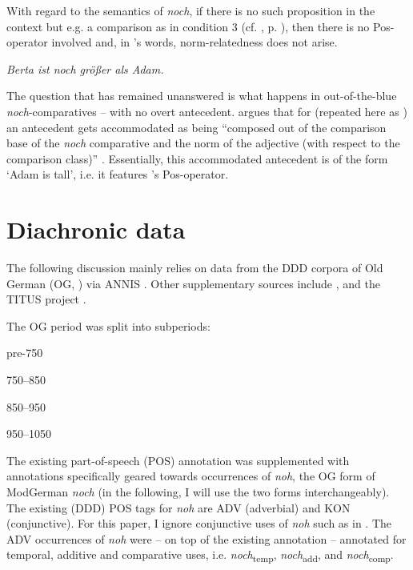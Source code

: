 \documentclass[output=paper]{langsci/langscibook}
\begin{document}
With regard to the semantics of \textit{noch}, if there is no such proposition in the context but e.g. a comparison as in condition 3 (cf. , p. \pageref{tab:4_conds}), then there is no Pos-operator involved \citep[62]{vonStechow1984} and, in \citeauthor{umbach2009a_comp}'s words, norm-relatedness does not arise.

\ea \itshape Berta ist noch größer als Adam. \label{B_noch_>_Adam_repeat}\z

The question that has remained unanswered is what happens in out-of-the-blue \textit{noch}-comparatives -- with no overt antecedent. \citeauthor{umbach2009a_comp} argues that for  (repeated here as ) an antecedent gets accommodated as being ``composed out of the comparison base of the \textit{noch} comparative and the norm of the adjective (with respect to the comparison class)'' \citep[10]{umbach2009a_comp}. Essentially, this accommodated antecedent is of the form `Adam is tall', i.e. it features \citeauthor{stechow2006}'s \citeyearpar{stechow2006} Pos-operator.


\section{Diachronic data}\label{sec_diachronic_data}


The following discussion mainly relies on data from the DDD corpora of Old German (OG, \citealt{ddd_OG}) via ANNIS \citep{annis_og}. Other supplementary sources include \citet{kali}, and the TITUS project \citep{titus}.

The OG period was split into subperiods: 

\begin{description}[style=unboxed,font=\normalfont\itshape,noitemsep]
\item[OG0] pre-750 
\item[OG1] 750--850 
\item[OG2] 850--950 
\item[OG3] 950--1050
\end{description}

The existing part-of-speech (POS) annotation was supplemented with annotations specifically geared towards occurrences of \textit{noh}, the OG form of ModGerman \textit{noch} (in the following, I will use the two forms interchangeably). The existing (DDD) POS tags for \textit{noh} are ADV (adverbial) and KON (conjunctive). For this paper, I ignore conjunctive uses of \textit{noh} such as in . The ADV occurrences of \textit{noh} were -- on top of the existing annotation -- annotated for temporal, additive and comparative uses, i.e. \textit{noch}\textsubscript{temp}, \textit{noch}\textsubscript{add}, and \textit{noch}\textsubscript{comp}.
\end{document}

